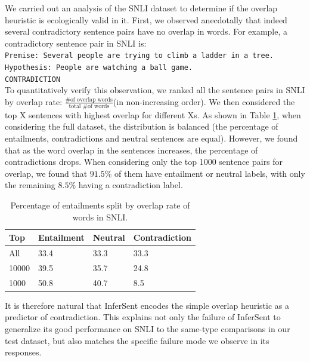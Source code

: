 We carried out an analysis of the SNLI dataset to determine if the overlap heuristic is ecologically valid in it. First, we observed anecdotally that indeed several contradictory sentence pairs have no overlap in words. For example, a contradictory sentence pair in SNLI is:\\
{\tt Premise: Several people are trying to climb a ladder in a tree. \\ Hypothesis: People are watching a ball game. \\ CONTRADICTION\\}
To quantitatively verify this observation, we ranked all the sentence pairs in SNLI by overlap rate: $\frac{\text{\# of overlap words}}{\text{total \# of words}}$(in non-increasing order). We then considered the top X sentences with highest overlap for different Xs. As shown in Table \ref{tab:highOverlap}, when considering the full dataset, the distribution is balanced (the percentage of entailments, contradictions and neutral sentences are equal). However, we found that as the word overlap in the sentences increases, the percentage of contradictions drops. When considering only the top 1000 sentence pairs for overlap, we found that $91.5\%$ of them have entailment or neutral labels, with only the remaining $8.5\%$ having a contradiction label. 

\begin{table}[htb]
  \begin{center}
  \begin{tabular}{llll}
  \toprule
     Top &Entailment & Neutral & Contradiction \\
    \midrule
All & 33.4 & 33.3 & 33.3 \\
10000 & 39.5 & 35.7 & 24.8\\
 1000 & 50.8 & 40.7 & 8.5\\
 \bottomrule
  \end{tabular}
 \caption{Percentage of entailments split by overlap rate of words in SNLI.}
 \label{tab:highOverlap}
 \end{center}
\end{table}

It is therefore natural that InferSent encodes the simple overlap heuristic as a predictor of contradiction. This explains not only the failure of InferSent to generalize its good performance on SNLI to the same-type comparisons in our test dataset, but also matches the specific failure mode we observe in its responses.

